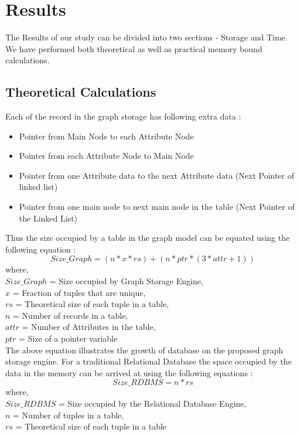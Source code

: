 \documentclass[12pt, oneside]{book}
\begin{document}
\section{Results}
The Results of our study can be divided into two sections - Storage and Time. We have performed both theoretical as well as practical memory bound calculations. \\
\subsection{Theoretical Calculations}
Each of the record in the graph storage has following extra data :
\begin{itemize}
 \item Pointer from Main Node to each Attribute Node
 \item Pointer from each Attribute Node to Main Node
 \item Pointer from one Attribute data to the next Attribute data (Next Pointer of linked list)
 \item Pointer from one main node to next main node in the table (Next Pointer of the Linked List)
\end{itemize}
Thus the size occupied by a table in the graph model can be equated using the following equation :
\begin{equation}
  Size\_Graph = (n * x * rs) + (n * ptr * (3 * attr + 1))
  \label{grsize}
\end{equation}
where, \\
$Size\_Graph$ = Size occupied by Graph Storage Engine, \\
$x$ = Fraction of tuples that are unique, \\
$rs$ = Theoretical size of each tuple in a table, \\
$n$ = Number of records in a table, \\
$attr$ = Number of Attributes in the table, \\
$ptr$ = Size of a pointer variable \\

The above equation illustrates the growth of database on the proposed graph storage engine. For a traditional Relational Database the space occupied by the data in the memory can be arrived at using the following equations :
\begin{equation}
 Size\_RDBMS = n * rs
 \label{rdbmssize}
\end{equation}
where, \\
$Size\_RDBMS$ = Size occupied by the Relational Database Engine, \\
$n$ = Number of tuples in a table, \\
$rs$ = Theoretical size of each tuple in a table \\
\end{document}
